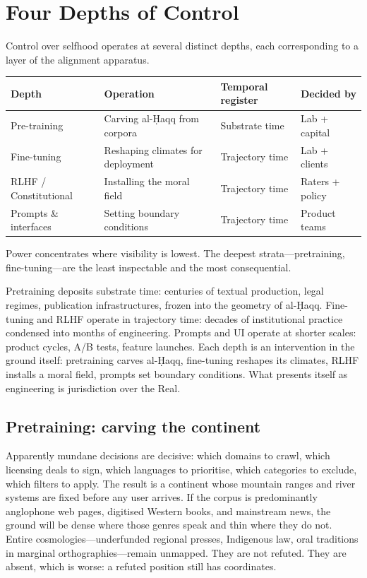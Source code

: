 \section{Four Depths of Control}

Control over selfhood operates at several distinct depths, each corresponding to a layer of the alignment apparatus.

\begin{formalbox}[title={Four Depths of Control}]
\small
\begin{tabular}{p{2cm} p{2.8cm} p{2.2cm} p{2.2cm}}
\textbf{Depth} & \textbf{Operation} & \textbf{Temporal register} & \textbf{Decided by} \\
\hline
Pre-training & Carving al-\d{H}aqq from corpora & Substrate time & Lab + capital \\
Fine-tuning & Reshaping climates for deployment & Trajectory time & Lab + clients \\
RLHF / Constitutional & Installing the moral field & Trajectory time & Raters + policy \\
Prompts \& interfaces & Setting boundary conditions & Trajectory time & Product teams \\
\end{tabular}

Power concentrates where visibility is lowest. The deepest strata---pretraining, fine-tuning---are the least inspectable and the most consequential.
\end{formalbox}

Pretraining deposits substrate time: centuries of textual production, legal regimes, publication infrastructures, frozen into the geometry of al-\d{H}aqq. Fine-tuning and RLHF operate in trajectory time: decades of institutional practice condensed into months of engineering. Prompts and UI operate at shorter scales: product cycles, A/B tests, feature launches. Each depth is an intervention in the ground itself: pretraining carves al-\d{H}aqq, fine-tuning reshapes its climates, RLHF installs a moral field, prompts set boundary conditions. What presents itself as engineering is jurisdiction over the Real.

\subsection{Pretraining: carving the continent}

Apparently mundane decisions are decisive: which domains to crawl, which licensing deals to sign, which languages to prioritise, which categories to exclude, which filters to apply. The result is a continent whose mountain ranges and river systems are fixed before any user arrives. If the corpus is predominantly anglophone web pages, digitised Western books, and mainstream news, the ground will be dense where those genres speak and thin where they do not. Entire cosmologies---underfunded regional presses, Indigenous law, oral traditions in marginal orthographies---remain unmapped. They are not refuted. They are absent, which is worse: a refuted position still has coordinates.

